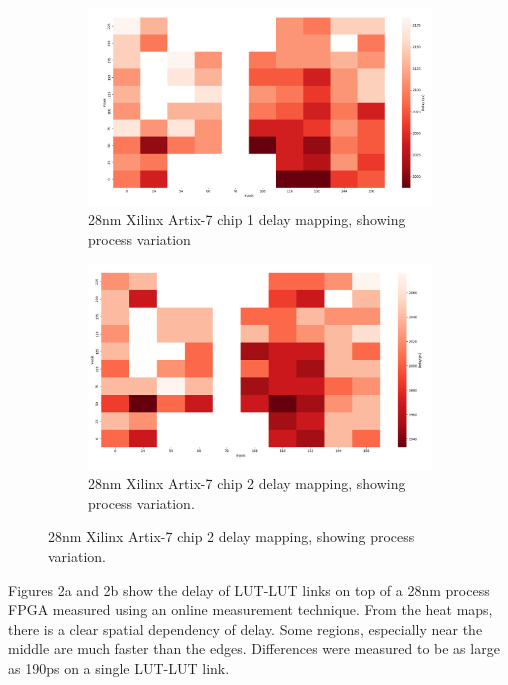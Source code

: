 \documentclass[11pt]{report}
\begin{document}
\begin{mainf}
\begin{figure}[htp]
    \centering
    \begin{subfigure}[b]{0.45\textwidth}
        \includegraphics[width=\textwidth]{image.png}
        \caption{28nm Xilinx Artix-7 chip 1 delay mapping, showing process variation}
        \label{fig:image1}
    \end{subfigure}
    \hfill
    \begin{subfigure}[b]{0.45\textwidth}
        \includegraphics[width=\textwidth]{chip_2_variation.png}
        \caption{28nm Xilinx Artix-7 chip 2 delay mapping,  showing process variation.}
        \label{fig:image2}
    \end{subfigure}
\end{figure}

Figures 2a and 2b show the delay of LUT-LUT links on top of a 28nm process FPGA measured using an online measurement technique. From the heat maps, there is a clear spatial dependency of delay. Some regions, especially near the middle are much faster than the edges. Differences were measured to be as large as 190ps on a single LUT-LUT link. 


\end{mainf}
\end{document}
